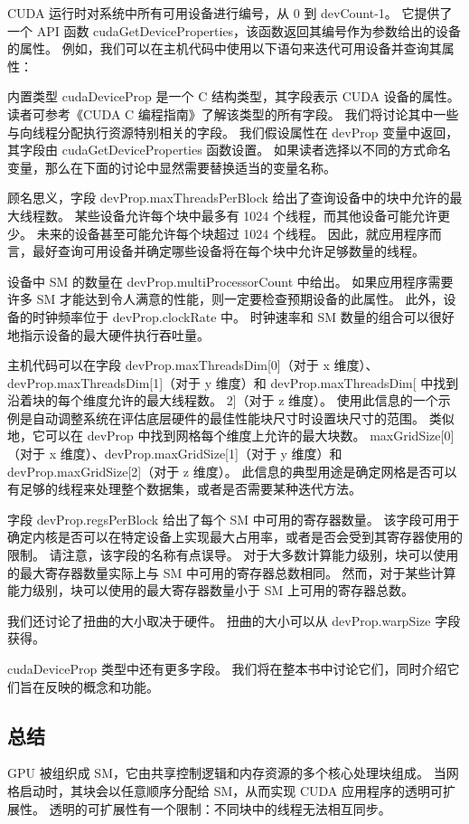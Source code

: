 CUDA 运行时对系统中所有可用设备进行编号，从 0 到 devCount-1。 它提供了一个 API 函数 cudaGetDeviceProperties，该函数返回其编号作为参数给出的设备的属性。 例如，我们可以在主机代码中使用以下语句来迭代可用设备并查询其属性：

内置类型 cudaDeviceProp 是一个 C 结构类型，其字段表示 CUDA 设备的属性。 读者可参考《CUDA C 编程指南》了解该类型的所有字段。 我们将讨论其中一些与向线程分配执行资源特别相关的字段。 我们假设属性在 devProp 变量中返回，其字段由 cudaGetDeviceProperties 函数设置。 如果读者选择以不同的方式命名变量，那么在下面的讨论中显然需要替换适当的变量名称。

顾名思义，字段 devProp.maxThreadsPerBlock 给出了查询设备中的块中允许的最大线程数。 某些设备允许每个块中最多有 1024 个线程，而其他设备可能允许更少。 未来的设备甚至可能允许每个块超过 1024 个线程。 因此，就应用程序而言，最好查询可用设备并确定哪些设备将在每个块中允许足够数量的线程。

设备中 SM 的数量在 devProp.multiProcessorCount 中给出。 如果应用程序需要许多 SM 才能达到令人满意的性能，则一定要检查预期设备的此属性。 此外，设备的时钟频率位于 devProp.clockRate 中。 时钟速率和 SM 数量的组合可以很好地指示设备的最大硬件执行吞吐量。

主机代码可以在字段 devProp.maxThreadsDim[0]（对于 x 维度）、devProp.maxThreadsDim[1]（对于 y 维度）和 devProp.maxThreadsDim[ 中找到沿着块的每个维度允许的最大线程数。 2]（对于 z 维度）。 使用此信息的一个示例是自动调整系统在评估底层硬件的最佳性能块尺寸时设置块尺寸的范围。 类似地，它可以在 devProp 中找到网格每个维度上允许的最大块数。 maxGridSize[0]（对于 x 维度）、devProp.maxGridSize[1]（对于 y 维度）和 devProp.maxGridSize[2]（对于 z 维度）。 此信息的典型用途是确定网格是否可以有足够的线程来处理整个数据集，或者是否需要某种迭代方法。

字段 devProp.regsPerBlock 给出了每个 SM 中可用的寄存器数量。 该字段可用于确定内核是否可以在特定设备上实现最大占用率，或者是否会受到其寄存器使用的限制。 请注意，该字段的名称有点误导。 对于大多数计算能力级别，块可以使用的最大寄存器数量实际上与 SM 中可用的寄存器总数相同。 然而，对于某些计算能力级别，块可以使用的最大寄存器数量小于 SM 上可用的寄存器总数。

我们还讨论了扭曲的大小取决于硬件。 扭曲的大小可以从 devProp.warpSize 字段获得。

cudaDeviceProp 类型中还有更多字段。 我们将在整本书中讨论它们，同时介绍它们旨在反映的概念和功能。

\subsection{总结}
GPU 被组织成 SM，它由共享控制逻辑和内存资源的多个核心处理块组成。 当网格启动时，其块会以任意顺序分配给 SM，从而实现 CUDA 应用程序的透明可扩展性。 透明的可扩展性有一个限制：不同块中的线程无法相互同步。

